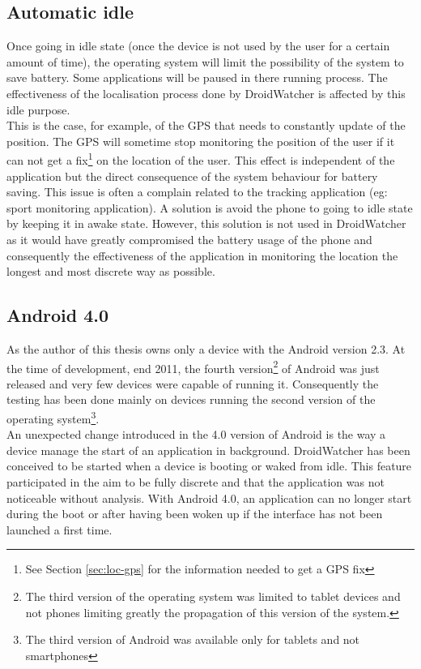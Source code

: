 \subsection{Automatic idle}

Once going in idle state (once the device is not used by the user for a certain amount of time), the operating system will limit the possibility of the system to save battery.
Some applications will be paused in there running process.
The effectiveness of the localisation process done by DroidWatcher is affected by this idle purpose.\\

This is the case, for example, of the GPS that needs to constantly update of the position.
The GPS will sometime stop monitoring the position of the user if it can not get a fix\footnote{See Section \ref{sec:loc-gps} for the information needed to get a GPS fix} on the location of the user.
This effect is independent of the application but the direct consequence of the system behaviour for battery saving. 
This issue is often a complain related to the tracking application (eg: sport monitoring application).
A solution is avoid the phone to going to idle state by keeping it in awake state.
However, this solution is not used in DroidWatcher as it would have greatly compromised the battery usage of the phone and consequently the effectiveness of the application in monitoring the location the longest and most discrete way as possible.

\subsection{Android 4.0}
\label{sec:dw-ics}

As the author of this thesis owns only a device with the Android version 2.3.
At the time of development, end 2011, the fourth version\footnote{The third version of the operating system was limited to tablet devices and not phones limiting greatly the propagation of this version of the system.} of Android was just released and very few devices were capable of running it.
Consequently the testing has been done mainly on devices running the second version of the operating system\footnote{The third version of Android was available only for tablets and not smartphones}.\\

An unexpected change introduced in the 4.0 version of Android is the way a device manage the start of an application in background.
DroidWatcher has been conceived to be started when a device is booting or waked from idle.
This feature participated in the aim to be fully discrete and that the application was not noticeable without analysis.
With Android 4.0, an application can no longer start during the boot or after having been woken up if the interface has not been launched a first time.\\

